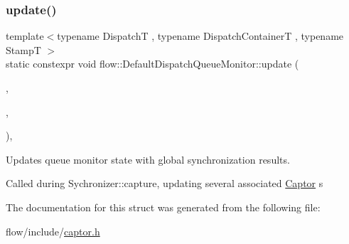 \subsubsection{\texorpdfstring{update()}{update()}}
{\footnotesize\ttfamily template$<$typename DispatchT , typename Dispatch\+ContainerT , typename StampT $>$ \\
static constexpr void flow\+::\+Default\+Dispatch\+Queue\+Monitor\+::update (\begin{DoxyParamCaption}\item[{\hyperlink{classflow_1_1_dispatch_queue}{Dispatch\+Queue}$<$ DispatchT, Dispatch\+ContainerT $>$ \&}]{,  }\item[{const \hyperlink{structflow_1_1_capture_range}{Capture\+Range}$<$ StampT $>$ \&}]{,  }\item[{const \hyperlink{namespaceflow_adefe9726e597eb50c46f0f6a202018e9}{State}}]{ }\end{DoxyParamCaption})\hspace{0.3cm}{\ttfamily [inline]}, {\ttfamily [static]}}



Updates queue monitor state with global synchronization results. 

Called during {\ttfamily Sychronizer\+::capture}, updating several associated \hyperlink{classflow_1_1_captor}{Captor} s 

The documentation for this struct was generated from the following file\+:\begin{DoxyCompactItemize}
\item 
flow/include/\hyperlink{captor_8h}{captor.\+h}\end{DoxyCompactItemize}
